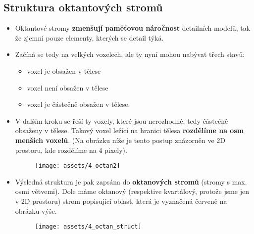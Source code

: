 \subsection{Struktura oktantových stromů}
\begin{itemize}
    \item Oktantové stromy \textbf{zmenšují paměťovou náročnost} detailních modelů, tak že zjemní pouze elementy, kterých se detail týká.
    \item Začíná se tedy na velkých voxelech, ale ty nyní mohou nabývat třech stavů:
          \begin{itemize}
              \item voxel je obsažen v tělese
              \item voxel není obsažen v tělese
              \item voxel je částečně obsažen v tělese.
          \end{itemize}
    \item V dalším kroku se řeší ty voxely, které jsou nerozhodné, tedy částečně obsaženy v tělese. Takový voxel ležící na hranici tělesa \textbf{rozdělíme na osm menších voxelů}. (Na obrázku níže je tento postup znázorněn ve 2D prostoru, kde rozdělíme na 4 pixely).
          \begin{figure}[H]
              \centering
              \texttt{[image: assets/4\_octan2]}
          \end{figure}
    \item Výsledná struktura je pak zapsána do \textbf{oktanových stromů} (stromy s max. osmi větvemi). Dole máme oktanový (respektive kvartálový, protože jsme jen v 2D prostoru) strom popisující oblast, která je vyznačená červeně na obrázku výše.
          \begin{figure}[H]
              \centering
              \texttt{[image: assets/4\_octan\_struct]}
          \end{figure}
\end{itemize}
